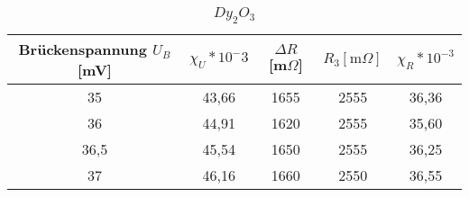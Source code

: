 \begin{table}[h]
	\begin{center}
		\begin{tabular}{cc|ccc}
			Brückenspannung $U_B$ [mV]&$\chi_{U}*10^-3$ & $\Delta R$ [m$\Omega$]&$R_3[\text{m}\Omega]$&$\chi_R*10^{-3}$\\ \hline
			35	&43,66&1655&2555&36,36\\
			36	&44,91&1620&2555&35,60\\
			36,5&45,54&1650&2555&36,25\\
			37	&46,16&1660&2550&36,55
		\end{tabular}
		\caption{$Dy_2O_3$}
		\label{tab4}
	\end{center}
\end{table}